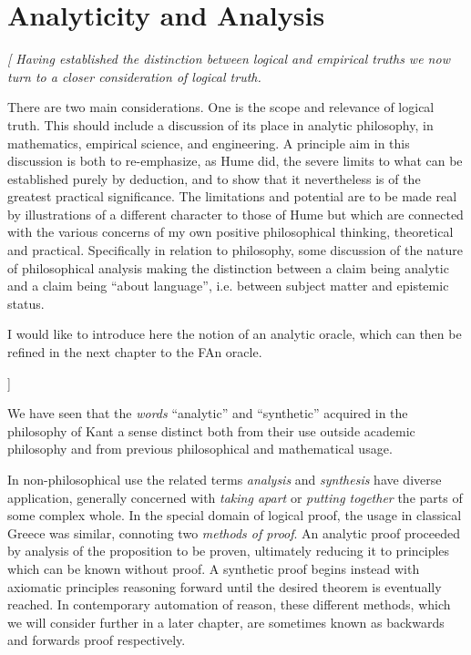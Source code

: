 
\chapter{Analyticity and Analysis}\label{AnalyticityAnalysis}

{\it[
Having established the distinction between logical and empirical
truths we now turn to a closer consideration of logical truth. 

There are two main considerations.
One is the scope and relevance of logical truth.
This should include a discussion of its place in analytic philosophy,
in mathematics, empirical science, and engineering. 
A principle aim in this discussion is both to re-emphasize, as Hume
did, the severe limits to what can be established purely by deduction,
and to show that it nevertheless is of the greatest practical
significance. 
The limitations and potential are to be made real by illustrations of
a different character to those of Hume but which are connected with
the various concerns of my own positive philosophical thinking,
theoretical and practical. 
Specifically in relation to philosophy, some discussion of the nature
of philosophical analysis making the distinction between a claim being
analytic and a claim being ``about language'', i.e. between subject
matter and epistemic status. 

I would like to introduce here the notion of an analytic oracle, which
can then be refined in the next chapter to the FAn oracle.

]}%

We have seen that the \emph{words} ``analytic'' and
``synthetic'' acquired in the philosophy of Kant a
sense distinct both from their use outside academic philosophy and
from previous philosophical and mathematical usage.

In non-philosophical use the related terms
\emph{analysis} and \emph{synthesis}
have diverse application, generally concerned with \emph{taking apart}
or \emph{putting together} the parts of some complex whole. 
In the special domain of logical proof, the usage in classical Greece
was similar, connoting two \emph{methods of proof}.
An analytic proof proceeded by analysis of the proposition to be
proven, ultimately reducing it to principles which can be known
without proof.
A synthetic proof begins instead with axiomatic principles reasoning
forward until the desired theorem is eventually reached.
In contemporary automation of reason, these different methods, which
we will consider further in a later chapter, are sometimes known as
backwards and forwards proof respectively. 


